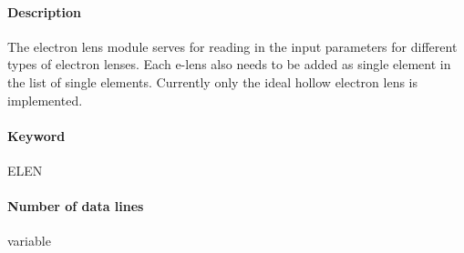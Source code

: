 \paragraph{Description} The electron lens module serves for reading in the input parameters for different types of electron lenses. Each e-lens also needs to be added as single element in the list of single elements. Currently only the ideal hollow electron lens is implemented.

\paragraph{Keyword} ELEN

\paragraph{Number of data lines} variable

